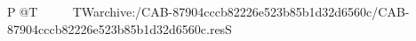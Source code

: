 P  @    T                                                     T  W   archive:/CAB-87904cccb82226e523b85b1d32d6560c/CAB-87904cccb82226e523b85b1d32d6560c.resS 